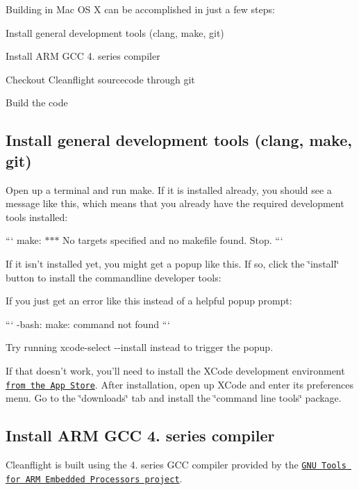 Building in Mac O\+S X can be accomplished in just a few steps\+:


\begin{DoxyItemize}
\item Install general development tools (clang, make, git)
\item Install A\+R\+M G\+C\+C 4. series compiler
\item Checkout Cleanflight sourcecode through git
\item Build the code
\end{DoxyItemize}

\subsection*{Install general development tools (clang, make, git)}

Open up a terminal and run {\ttfamily make}. If it is installed already, you should see a message like this, which means that you already have the required development tools installed\+:

``` make\+: $\ast$$\ast$$\ast$ No targets specified and no makefile found. Stop. ```

If it isn't installed yet, you might get a popup like this. If so, click the \char`\"{}install\char`\"{} button to install the commandline developer tools\+:



If you just get an error like this instead of a helpful popup prompt\+:

``` -\/bash\+: make\+: command not found ```

Try running {\ttfamily xcode-\/select -\/-\/install} instead to trigger the popup.

If that doesn't work, you'll need to install the X\+Code development environment \href{https://itunes.apple.com/us/app/xcode/id497799835}{\tt from the App Store}. After installation, open up X\+Code and enter its preferences menu. Go to the \char`\"{}downloads\char`\"{} tab and install the \char`\"{}command line tools\char`\"{} package.

\subsection*{Install A\+R\+M G\+C\+C 4. series compiler}

Cleanflight is built using the 4. series G\+C\+C compiler provided by the \href{https://launchpad.net/gcc-arm-embedded}{\tt G\+N\+U Tools for A\+R\+M Embedded Processors project}.

